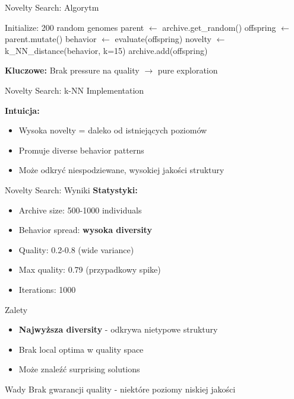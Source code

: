 \documentclass{beamer}
\begin{document}
\begin{frame}{Novelty Search: Algorytm}
\begin{algorithmic}[1]
\STATE Initialize: 200 random genomes
    \STATE parent $\leftarrow$ archive.get\_random()
    \STATE offspring $\leftarrow$ parent.mutate()
    \STATE behavior $\leftarrow$ evaluate(offspring)
    \STATE novelty $\leftarrow$ k\_NN\_distance(behavior, k=15)
        \STATE archive.add(offspring)
    \ENDIF
\ENDFOR
\end{algorithmic}

\vspace{0.5cm}
\textbf{Kluczowe:} Brak pressure na quality $\rightarrow$ pure exploration
\end{frame}

\begin{frame}[fragile]{Novelty Search: k-NN Implementation}


\vspace{0.5cm}
\textbf{Intuicja:}
\begin{itemize}
\item Wysoka novelty = daleko od istniejących poziomów
\item Promuje diverse behavior patterns
\item Może odkryć niespodziewane, wysokiej jakości struktury
\end{itemize}
\end{frame}

\begin{frame}{Novelty Search: Wyniki}
\textbf{Statystyki:}
\begin{itemize}
\item Archive size: 500-1000 individuals
\item Behavior spread: \textbf{wysoka diversity}
\item Quality: 0.2-0.8 (wide variance)
\item Max quality: 0.79 (przypadkowy spike)
\item Iterations: 1000
\end{itemize}

\vspace{0.5cm}
\begin{exampleblock}{Zalety}
\begin{itemize}
\item \textbf{Najwyższa diversity} - odkrywa nietypowe struktury
\item Brak local optima w quality space
\item Może znaleźć surprising solutions
\end{itemize}
\end{exampleblock}

\begin{alertblock}{Wady}
Brak gwarancji quality - niektóre poziomy niskiej jakości
\end{alertblock}
\end{frame}
\end{document}
